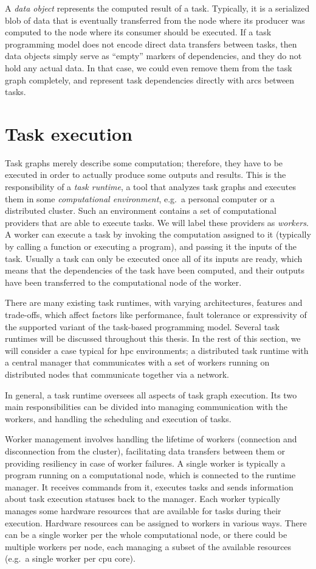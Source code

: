 A \emph{data object} represents the computed result of a task. Typically, it is a serialized
blob of data that is eventually transferred from the node where its producer was computed to the
node where its consumer should be executed. If a task programming model does not encode direct data
transfers between tasks, then data objects simply serve as ``empty'' markers of dependencies, and
they do not hold any actual data. In that case, we could even remove them from the task graph
completely, and represent task dependencies directly with arcs between tasks.

\section{Task execution}
Task graphs merely describe some computation; therefore, they have to be executed in order to
actually produce some outputs and results. This is the responsibility of a \emph{task runtime},
a tool that analyzes task graphs and executes them in some \emph{computational environment}, e.g.\ a personal
computer or a distributed cluster. Such an environment contains a set of computational providers
that are able to execute tasks. We will label these providers as \emph{workers}. A worker
can execute a task by invoking the computation assigned to it (typically by calling a function or
executing a program), and passing it the inputs of the task. Usually a task can only be executed
once all of its inputs are ready, which means that the dependencies of the task have been computed,
and their outputs have been transferred to the computational node of the worker.

There are many existing task runtimes, with varying architectures, features and trade-offs, which
affect factors like performance, fault tolerance or expressivity of the supported variant of the
task-based programming model. Several task runtimes will be discussed throughout this thesis. In
the rest of this section, we will consider a case typical for \gls{hpc} environments;
a distributed task runtime with a central manager that communicates with a set of workers running
on distributed nodes that communicate together via a network.

In general, a task runtime oversees all aspects of task graph execution. Its two main
responsibilities can be divided into managing communication with the workers, and handling the
scheduling and execution of tasks.

Worker management involves handling the lifetime of workers (connection and disconnection from the
cluster), facilitating data transfers between them or providing resiliency in case of worker
failures. A single worker is typically a program running on a computational node, which is
connected to the runtime manager. It receives commands from it, executes tasks and sends
information about task execution statuses back to the manager. Each worker typically manages some
hardware resources that are available for tasks during their execution. Hardware resources can be
assigned to workers in various ways. There can be a single worker per the whole computational node,
or there could be multiple workers per node, each managing a subset of the available resources
(e.g.\ a single worker per \gls{cpu} core).

